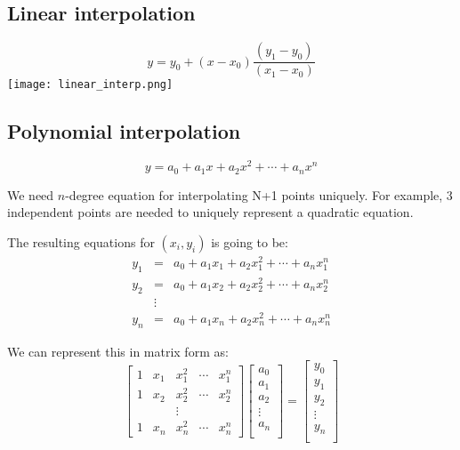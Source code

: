 \documentclass[11pt,titlepage,fleqn]{article}
\begin{document}
\subsection{Linear interpolation}
\begin{equation}
y =  y_0 + (x - x_0) \frac{(y_1 - y_0)}{(x_1 - x_0)}
\end{equation}
\texttt{[image: linear\_interp.png]}

\subsection{Polynomial interpolation}
\begin{equation}
y = a_0 + a_1x + a_2x^2 + \cdots + a_nx^n
\end{equation}

We need $n$-degree equation for interpolating N+1 points uniquely. For example, 3 independent points are needed to uniquely represent a quadratic equation. 

The resulting equations for $(x_i,y_i)$ is going to be:
\begin{eqnarray}
y_1 &=& a_0 + a_1x_1 + a_2x_1^2 + \cdots + a_nx_1^n\\
y_2 &=& a_0 + a_1x_2 + a_2x_2^2 + \cdots + a_nx_2^n\\
&\vdots& \\
y_n &=& a_0 + a_1x_n + a_2x_n^2 + \cdots + a_nx_n^n
\end{eqnarray}

We can represent this in matrix form as:
\begin{equation}
\begin{bmatrix}
1 & x_1 &  x_1^2  & \cdots & x_1^n\\
1 & x_2 & x_2^2 & \cdots & x_2^n\\
& & \vdots& &  \\
1 & x_n & x_n^2 & \cdots & x_n^n
\end{bmatrix}
\begin{bmatrix}
a_0 \\
a_1 \\
a_2 \\
\vdots\\
a_n\\
\end{bmatrix} = 
\begin{bmatrix}
y_0 \\
y_1 \\
y_2 \\
\vdots\\
y_n\\
\end{bmatrix} \label{eq:vandermonde}
\end{equation}
\end{document}
